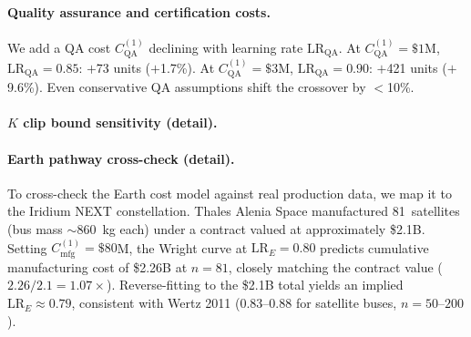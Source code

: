 \documentclass[5p,twocolumn]{elsarticle}
\begin{document}
\paragraph{Quality assurance and certification costs.} We add a QA cost $C_{\mathrm{QA}}^{(1)}$ declining with learning rate $\mathrm{LR}_{\mathrm{QA}}$. At $C_{\mathrm{QA}}^{(1)} = \$1$M, $\mathrm{LR}_{\mathrm{QA}} = 0.85$: $+$73 units ($+$1.7\%). At $C_{\mathrm{QA}}^{(1)} = \$3$M, $\mathrm{LR}_{\mathrm{QA}} = 0.90$: $+$421 units ($+$9.6\%). Even conservative QA assumptions shift the crossover by $<$10\%.

\paragraph{$K$ clip bound sensitivity (detail).}

\begin{table}[htbp]
\centering
\caption{$K$ clip upper bound sensitivity (10{,}000~runs, $r = 5\%$, $H = 40{,}000$). Raising the clip from \$200B to \$500B has negligible effect on convergence or conditional median.}
\label{tab:k_clip}
\small
{}
\end{table}

\paragraph{Earth pathway cross-check (detail).} To cross-check the Earth cost model against real production data, we map it to the Iridium NEXT constellation. Thales Alenia Space manufactured 81~satellites (bus mass $\sim$860~kg each) under a contract valued at approximately \$2.1B. Setting $C_{\mathrm{mfg}}^{(1)} = \$80$M, the Wright curve at $\mathrm{LR}_E = 0.80$ predicts cumulative manufacturing cost of \$2.26B at $n = 81$, closely matching the contract value ($2.26/2.1 = 1.07\times$). Reverse-fitting to the \$2.1B total yields an implied $\mathrm{LR}_E \approx 0.79$, consistent with Wertz 2011 \cite{wertz2011} (0.83--0.88 for satellite buses, $n = 50$--$200$).
\end{document}

